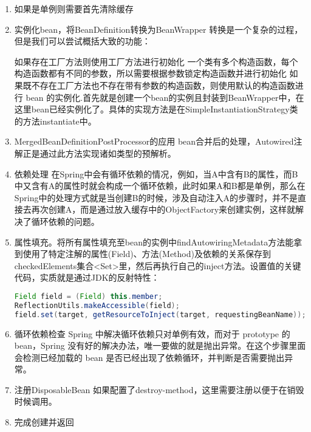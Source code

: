 \documentclass[../../../interview-questions.tex]{subfiles}
\begin{document}
\begin{enumerate}
\item{如果是单例则需要首先清除缓存} 
\item{实例化bean，将BeanDefinition转换为BeanWrapper}
转换是一个复杂的过程，但是我们可以尝试概括大致的功能：

如果存在工厂方法则使用工厂方法进行初始化
一个类有多个构造函数，每个构造函数都有不同的参数，所以需要根据参数锁定构造函数并进行初始化
如果既不存在工厂方法也不存在带有参数的构造函数，则使用默认的构造函数进行 bean 的实例化.首先就是创建一个bean的实例且封装到BeanWrapper中，在这里bean已经实例化了。具体的实现方法是在SimpleInstantiationStrategy类的方法instantiate中。

\item{MergedBeanDefinitionPostProcessor的应用}
bean合并后的处理，Autowired注解正是通过此方法实现诸如类型的预解析。

\item{依赖处理}
在Spring中会有循环依赖的情况，例如，当A中含有B的属性，而B中又含有A的属性时就会构成一个循环依赖，此时如果A和B都是单例，那么在Spring中的处理方式就是当创建B的时候，涉及自动注入A的步骤时，并不是直接去再次创建A，而是通过放入缓存中的ObjectFactory来创建实例，这样就解决了循环依赖的问题。

\item{属性填充。将所有属性填充至bean的实例中}findAutowiringMetadata方法能拿到使用了特定注解的属性(Field)、方法(Method)及依赖的关系保存到checkedElements集合<Set>里，然后再执行自己的inject方法。设置值的关键代码，实质就是通过JDK的反射特性：


\begin{lstlisting}[language=Java]
Field field = (Field) this.member;
ReflectionUtils.makeAccessible(field);
field.set(target, getResourceToInject(target, requestingBeanName));
\end{lstlisting}



\item{循环依赖检查}
Spring 中解决循环依赖只对单例有效，而对于 prototype 的 bean，Spring 没有好的解决办法，唯一要做的就是抛出异常。在这个步骤里面会检测已经加载的 bean 是否已经出现了依赖循环，并判断是否需要抛出异常。

\item{注册DisposableBean}
如果配置了destroy-method，这里需要注册以便于在销毁时候调用。

\item{完成创建并返回}

\end{enumerate}
\end{document}
